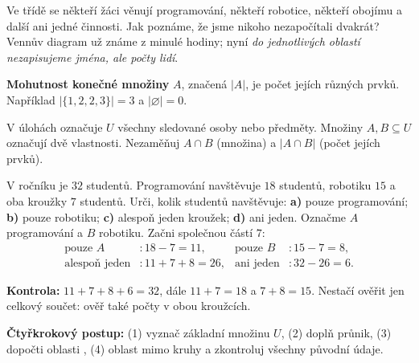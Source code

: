 \documentclass[11pt,a4paper]{article}
\begin{document}
Ve třídě se někteří žáci věnují programování, někteří robotice, někteří
obojímu a další ani jedné činnosti. Jak poznáme, že jsme nikoho
nezapočítali dvakrát? Vennův diagram už známe z minulé hodiny; nyní
\emph{do jednotlivých oblastí nezapisujeme jména, ale počty lidí}.

\begin{definiceBox}[title={Definice - Mohutnost konečné množiny}]
\textbf{Mohutnost konečné množiny} $A$, značená $|A|$, je počet jejích
různých prvků. Například $|\{1,2,2,3\}|=3$ a $|\varnothing|=0$.
\end{definiceBox}

V úlohách označuje $U$ všechny sledované osoby nebo předměty.
Množiny $A,B\subseteq U$ označují dvě vlastnosti. Nezaměňuj $A\cap B$
(množina) a $|A\cap B|$ (počet jejích prvků).

\begin{prikladReseniBox}[title={Příklad 1}]
V ročníku je $32$ studentů. Programování navštěvuje $18$ studentů,
robotiku $15$ a oba kroužky $7$ studentů. Urči, kolik studentů navštěvuje:
\textbf{a)} pouze programování; \textbf{b)} pouze robotiku;
\textbf{c)} alespoň jeden kroužek; \textbf{d)} ani jeden.
\tcblower
Označme $A$ programování a $B$ robotiku. Začni společnou částí $7$:
\[
\begin{aligned}
\text{pouze }A &:18-7=11, & \text{pouze }B &:15-7=8,\\
\text{alespoň jeden} &:11+7+8=26, & \text{ani jeden} &:32-26=6.
\end{aligned}
\]
\begin{center}
\end{center}
\textbf{Kontrola:} $11+7+8+6=32$, dále $11+7=18$ a $7+8=15$.
Nestačí ověřit jen celkový součet: ověř také počty v obou kroužcích.

\textbf{Čtyřkrokový postup:} (1) vyznač základní množinu $U$,
(2) doplň průnik, (3) dopočti oblasti , (4) oblast mimo kruhy
a zkontroluj všechny původní údaje.
\end{prikladReseniBox}
\end{document}
